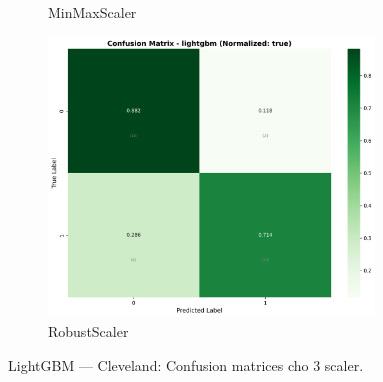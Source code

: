 \begin{figure}[H]
\begin{subfigure}[b]{0.31\textwidth}
\caption{MinMaxScaler}
\label{fig:lgbm_clev_cm_minmax}
\end{subfigure}\hfill
\begin{subfigure}[b]{0.31\textwidth}
\centering
\includegraphics[width=0.95\textwidth]{Result/cleveland_dataset/confusion_matrices/lightgbm_numeric_dataset_RobustScaler.png}
\caption{RobustScaler}
\label{fig:lgbm_clev_cm_robust}
\end{subfigure}
\caption{LightGBM — Cleveland: Confusion matrices cho 3 scaler.}
\label{fig:lgbm_clev_confusions}
\end{figure}

